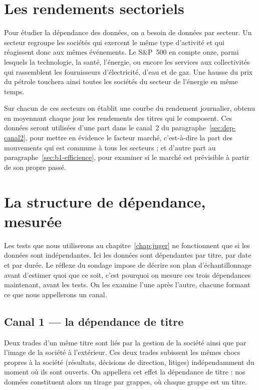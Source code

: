 \section{Les rendements sectoriels}
\label{sec:donnees-secteurs}


Pour étudier la dépendance des données, on a besoin de données par secteur.
Un secteur regroupe les sociétés qui exercent le même type d'activité et qui
réagissent donc aux mêmes événements. Le S\&P~500 en compte onze, parmi
lesquels la technologie, la santé, l'énergie, ou encore les services aux
collectivités qui rassemblent les fournisseurs d'électricité, d'eau et de gaz.
Une hausse du prix du pétrole touchera ainsi toutes les sociétés du secteur de
l'énergie en même temps.

Sur chacun de ces secteurs on établit une courbe du rendement journalier,
obtenu en moyennant chaque jour les rendements des titres qui le composent.
Ces données seront utilisées d'une part dans le canal~2 du
paragraphe~\ref{sec:dep-canal2}, pour mettre en évidence le facteur
marché, c'est-à-dire la part des mouvements qui est commune à tous les
secteurs ; et d'autre part au paragraphe~\ref{sec:b1-efficience}, pour
examiner si le marché est prévisible à partir de son propre passé.



\section{La structure de dépendance, mesurée}
\label{sec:dep-mesuree}


Les tests que nous utiliserons au chapitre~\ref{chap:juger} ne fonctionnent que
si les données sont indépendantes.
Ici les données sont dépendantes par titre, par date et par durée.
Le réflexe du sondage impose de décrire son plan d'échantillonnage avant
d'estimer quoi que ce soit, c'est pourquoi on mesure ces trois dépendances
maintenant, avant les tests. On les examine l'une après l'autre, chacune
formant ce que nous appellerons un canal.

\subsection{Canal 1 --- la dépendance de titre}
\label{sec:dep-canal1}


Deux trades d'un même titre sont liés par la gestion de la société
ainsi que par l'image de la société à l'extérieur.
Ces deux trades subissent les mêmes chocs propres à la société (résultats,
décisions de direction, litiges) indépendamment du moment où ils sont
ouverts.
On appellera cet effet la dépendance de titre : nos données constituent
alors un tirage par grappes, où chaque grappe est un titre.

